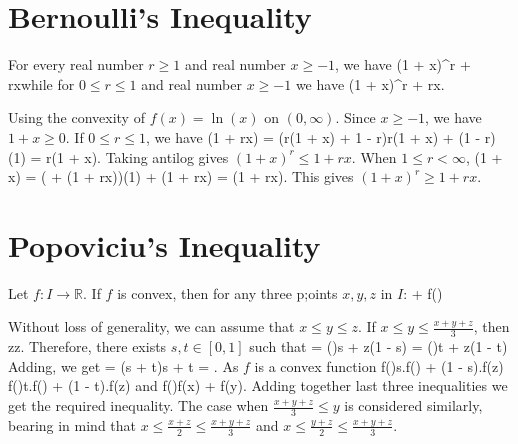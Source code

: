 \section{Bernoulli's Inequality}
\starttheorem
  For every real number $r\geq 1$ and real number $x\geq -1$, we have \startformula (1 + x)^r + rx\stopformula while for $0\leq r\leq 1$ and real
  number $x\geq -1$ we have \startformula (1 + x)^r + rx.\stopformula
\stoptheorem

\startproof
  Using the convexity of $f(x) = \ln(x)$ on $(0, \infty)$. Since $x\geq -1$, we have $1 + x\geq 0$. If $0 \leq r \leq 1$, we have
  \startformula \ln(1 + rx) = \ln(r(1 + x) + 1 - r)\geq r\ln(1 + x) + (1 - r)\ln(1) = r\ln(1 + x).\stopformula
  Taking antilog gives $(1 + x)^r\leq 1 + rx.$ When $1\leq r < \infty$,
  \startformula \ln(1 + x) = \ln\left( + (1 + rx)\right)\geq{}\ln(1) + \ln(1 + rx) =
  \ln(1 + rx).\stopformula
  This gives $(1 + x)^r\geq 1 + rx.$
\stopproof

\section{Popoviciu's Inequality}
\starttheorem
  Let $f: I\rightarrow\mathbb{R}$. If $f$ is convex, then for any three p;oints $x, y, z$ in $I$:
  \placeformula\startformula
     + f\left(\right)\geq {}
  \stopformula
\stoptheorem

\startproof
  Without loss of generality, we can assume that $x\leq y\leq z$. If $x\leq y\leq \frac{x + y + z}{3}$, then
  \startformula {}\leq {}\leq z\leq {}\leq z.\stopformula
  Therefore, there exists $s, t\in[0,1]$ such that
  \startformula {} = \left(\right)s + z(1 - s)\stopformula
  \startformula {} = \left(\right)t + z(1 - t)\stopformula
  Adding, we get
  \startformula {} = (s + t)\Rightarrow s + t = .\stopformula
  As $f$ is a convex function
  \startformula f\left(\right)\leq s.f\left(\right) + (1 - s).f(z)\stopformula
  \startformula f\left(\right)\leq t.f\left(\right) + (1 - t).f(z)\stopformula
  and
  \startformula f\left(\right)\leq {}f(x) + f(y).\stopformula
  Adding together last three inequalities we get the required inequality.
  The case when $\frac{x + y + z}{3}\leq y$ is considered similarly, bearing in mind that $x\leq \frac{x + z}{2}\leq \frac{x + y +
    z}{3}$ and $x\leq\frac{y + z}{2}\leq\frac{x + y + z}{3}$.

